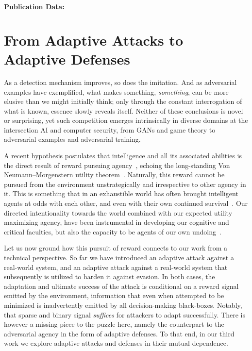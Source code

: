 \textbf{Publication Data:} 

\section{From Adaptive Attacks to Adaptive Defenses}

As a detection mechanism improves, so does the imitation.
And as adversarial examples have exemplified, what makes something, \textit{something}, can be more elusive than we might initially think; only through the constant interrogation of what is known, essence slowly reveals itself.
Neither of these conclusions is novel or surprising, yet such competition emerges intrinsically in diverse domains at the intersection \gls{AI} and computer security, from \gls{GAN}s and game theory to adversarial examples and adversarial training.

A recent hypothesis postulates that intelligence and all its associated abilities is the direct result of reward pursuing agency~\cite{silver2021reward}, echoing the long-standing Von Neumann–Morgenstern utility theorem~\cite{von1947theory}.
Naturally, this reward cannot be pursued from the environment unstrategically and irrespective to other agency in it.
This is something that in an exhaustible world has often brought intelligent agents at odds with each other, and even with their own continued survival~\cite{tohme2019superrational}.
Our directed intentionality towards the world combined with our expected utility maximizing agency, have been instrumental in developing our cognitive and critical faculties, but also the capacity to be agents of our own undoing~\cite{rlblogpost, skalse2022defining}.

Let us now ground how this pursuit of reward connects to our work from a technical perspective.
So far we have introduced an adaptive attack against a real-world system, and an adaptive attack against a real-world system that subsequently is utilized to harden it against evasion.
In both cases, the adaptation and ultimate success of the attack is conditional on a reward signal emitted by the environment, information that even when attempted to be minimized is inadvertently emitted by all decision-making black-boxes.
Notably, that sparse and binary signal \textit{suffices} for attackers to adapt successfully.
There is however a missing piece to the puzzle here, namely the counterpart to the adversarial agency in the form of adaptive defenses.
To that end, in our third work we explore adaptive attacks and defenses in their mutual dependence.

